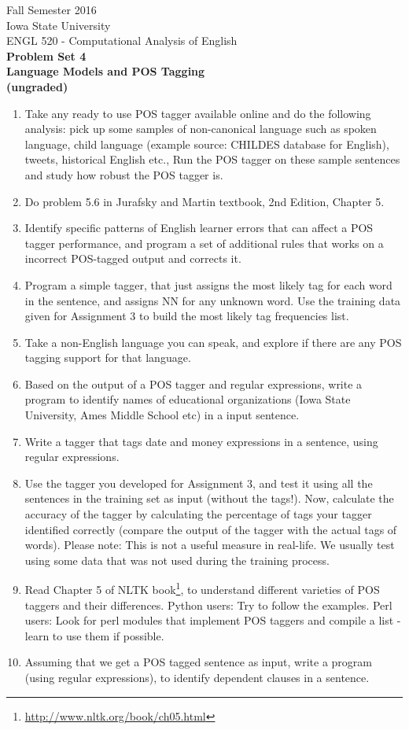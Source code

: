 \documentclass[11pt,a4paper]{article}
\begin{document}
\begin{center}
  Fall Semester 2016 \\ Iowa State University\\[3ex]
  {\large ENGL 520 - Computational Analysis of English}\\[3ex]
  \textbf{Problem Set 4} \\ \textbf{Language Models and POS Tagging \\ (ungraded)}
\end{center}

\begin{enumerate}
\item Take any ready to use POS tagger available online and do the following analysis: pick up some samples of non-canonical language such as spoken language, child language (example source: CHILDES database for English), tweets, historical English etc., Run the POS tagger on these sample sentences and study how robust the POS tagger is.
\item Do problem 5.6 in Jurafsky and Martin textbook, 2nd Edition, Chapter 5.
\item Identify specific patterns of English learner errors that can affect a POS tagger performance, and program a set of additional rules that works on a incorrect POS-tagged output and corrects it.
\item Program a simple tagger, that just assigns the most likely tag for each word in the sentence, and assigns NN for any unknown word. Use the training data given for Assignment 3 to build the most likely tag frequencies list. 
\item Take a non-English language you can speak, and explore if there are any POS tagging support for that language. 
\item Based on the output of a POS tagger and regular expressions, write a program to identify names of educational organizations (Iowa State University, Ames Middle School etc) in a input sentence.
\item Write a tagger that tags date and money expressions in a sentence, using regular expressions.
\item Use the tagger you developed for Assignment 3, and test it using all the sentences in the training set as input (without the tags!). Now, calculate the accuracy of the tagger by calculating the percentage of tags your tagger identified correctly (compare the output of the tagger with the actual tags of words). Please note: This is not a useful measure in real-life. We usually test using some data that was not used during the training process.
\item Read Chapter 5 of NLTK book\footnote{\url{http://www.nltk.org/book/ch05.html}}, to understand different varieties of POS taggers and their differences. Python users: Try to follow the examples. Perl users: Look for perl modules that implement POS taggers and compile a list - learn to use them if possible.
\item Assuming that we get a POS tagged sentence as input, write a program (using regular expressions), to identify dependent clauses in a sentence. 
\end{enumerate}
\end{document}
